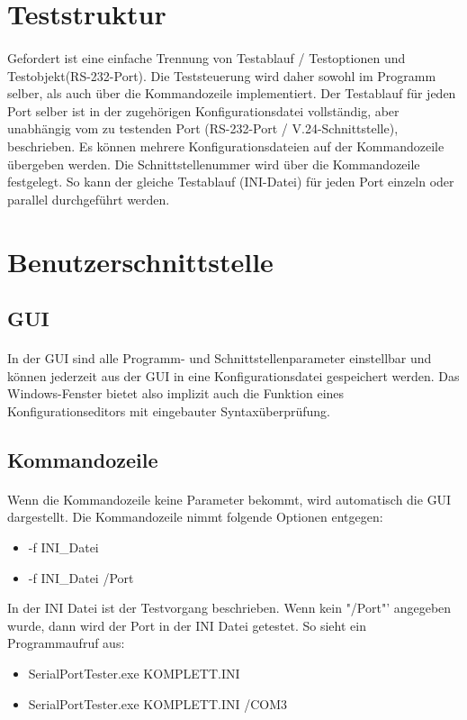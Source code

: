 \section{Teststruktur}
\paragraph{}
Gefordert ist eine einfache Trennung von Testablauf / Testoptionen  und  Testobjekt(RS-232-Port). Die Teststeuerung wird daher sowohl im Programm selber, als auch über die Kommandozeile implementiert. Der Testablauf für jeden Port selber ist in der zugehörigen Konfigurationsdatei vollständig, aber unabhängig vom zu testenden Port (RS-232-Port / V.24-Schnittstelle), beschrieben. Es können mehrere Konfigurationsdateien auf der Kommandozeile übergeben werden. Die Schnittstellenummer wird über die Kommandozeile festgelegt. So kann der gleiche Testablauf (INI-Datei) für jeden Port einzeln oder parallel durchgeführt werden.


\section{Benutzerschnittstelle}

\subsection{GUI}
\paragraph{}
In der GUI sind alle Programm- und Schnittstellenparameter einstellbar und können jederzeit aus der GUI in eine Konfigurationsdatei gespeichert werden. Das Windows-Fenster bietet also implizit auch die Funktion eines Konfigurationseditors mit eingebauter Syntaxüberprüfung.


\subsection{Kommandozeile}
\paragraph{}
Wenn die Kommandozeile keine Parameter bekommt, wird automatisch die GUI dargestellt. Die Kommandozeile nimmt folgende Optionen entgegen:
\begin{itemize}
\item -f INI\_Datei
\item -f INI\_Datei /Port
\end{itemize} 
In der INI Datei ist der Testvorgang beschrieben. Wenn kein "/Port"' angegeben wurde, dann wird der Port in der INI Datei getestet. So sieht ein Programmaufruf aus:
\begin{itemize}
\item SerialPortTester.exe KOMPLETT.INI
\item SerialPortTester.exe KOMPLETT.INI /COM3 
\end{itemize} 

